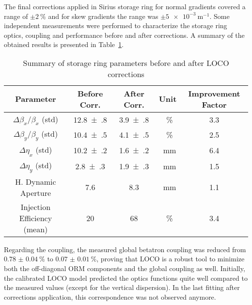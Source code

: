     The final corrections applied in Sirius storage ring for normal gradients covered a range of $\pm\SI{2}{\%}$ and for skew gradients the range was $\pm\SI{5e-3}{\meter^{-1}}$. Some independent measurements were performed to characterize the storage ring optics, coupling and performance before and after corrections. A summary of the obtained results is presented in Table~\ref{tab:params_corr_summary}.
\begin{table}[h!]
    \centering
    \caption{Summary of storage ring parameters before and after LOCO corrections}
    \label{tab:params_corr_summary}
    \begin{tabular}{ccccc}
        \toprule\toprule
        Parameter & Before Corr. & After Corr. & Unit & Improvement Factor\\
        \hline
        $\Delta\beta_x/\beta_x$ (std) & \num{12.8(8)} & \num{3.9(8)} & \SI{}{\%} & \num{3.3} \\
        $\Delta\beta_y/\beta_y$ (std) & \num{10.4(5)} & \num{4.1(5)} & \SI{}{\%} & \num{2.5} \\
        $\Delta\eta_x$ (std) &  \num{10.2(2)} &  \num{1.6(2)} & \SI{}{\milli\meter} & \num{6.4} \\
        $\Delta\eta_y$ (std) &  \num{2.8(3)} &  \num{1.9(3)} & \SI{}{\milli\meter}& \num{1.5} \\
        H. Dynamic Aperture  & \num{7.6} & \num{8.3} & \SI{}{\milli\meter} & \num{1.1} \\
        Injection Efficiency (mean)  & \num{20} & \num{68} & \SI{}{\%} & \num{3.4} \\
        \bottomrule\bottomrule
    \end{tabular}
\end{table}

Regarding the coupling, the measured global betatron coupling was reduced from $\SI{0.78(4)}{\%}$ to $\SI{0.07(1)}{\%}$, proving that LOCO is a robust tool to minimize both the off-diagonal ORM components and the global coupling as well. Initially, the calibrated LOCO model predicted the optics functions quite well compared to the measured values (except for the vertical dispersion). In the last fitting after corrections application, this correspondence was not observed anymore. 

